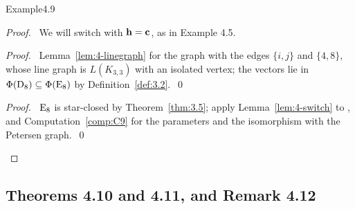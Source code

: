 \begin{cgss}{Example}{4.9}\label{ex:4.9}
\end{cgss}
\begin{proof}
 \pfsketch\ We will switch with ${\mathbf h}={\mathbf c}$, as in Example 4.5.
 \begin{proof}\pf\ Lemma~\ref{lem:4-linegraph} for the graph with the edges $\{i,j\}$ and
  $\{4,8\}$, whose line graph is $L(K_{3,3})$ with an isolated vertex; the vectors lie in
  $\Phi(\mathrm{D}_8)\subseteq\Phi(\mathrm{E}_8)$ by Definition~\ref{def:3.2}.~\qed\end{proof}
 \qedstep
 \begin{proof}\pf\ $\mathrm{E}_8$ is star-closed by Theorem~\ref{thm:3.5}; apply
  Lemma~\ref{lem:4-switch} to , and Computation~\ref{comp:C9} for the
  parameters and the isomorphism with the Petersen graph.~\qed\end{proof}
\end{proof}

\subsection{Theorems 4.10 and 4.11, and Remark 4.12}

